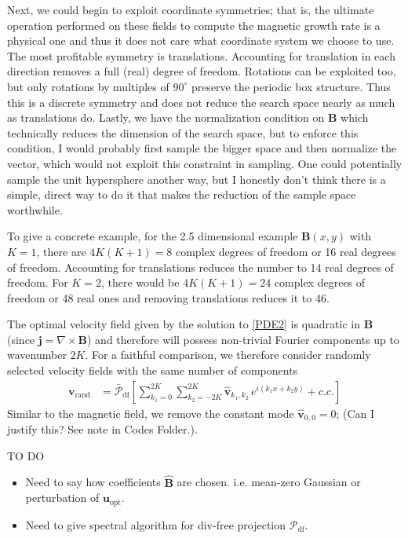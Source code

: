 \documentclass[onecolumn,showpacs,preprintnumbers,amsmath,amssymb]{revtex4-2}
\newcommand{\nick}[1]{{\color{orange}#1}}
\newcommand{\vsp}[1]{\vspace{#1 pc} \noindent}
\newcommand{\bvec}[1]{{\mathbf{#1}}}
\newcommand{\grad}{\nabla}
\newcommand{\uu}{\bvec{u}}
\newcommand{\uopt}{\uu_{\text{opt}}}
\newcommand{\vv}{\bvec{v}}
\newcommand{\Bvec}{\bvec{B}}
\newcommand{\jvec}{\bvec{j}}
\newcommand{\proj}{ \mathcal{P}_{\text{df}} }
\newcommand{\nproj}{ \bar{\mathcal{P}}_{\text{df}} }
\newcommand{\eikx}{e^{ i \left( k_1 x + k_2 y \right) }}
\newcommand{\vrand}{\vv_{\text{rand}}}
\begin{document}
Next, we could begin to exploit coordinate symmetries; that is, the ultimate operation performed on these fields to compute the magnetic growth rate is a physical one and thus it does not care what coordinate system we choose to use. The most profitable symmetry is translations. Accounting for translation in each direction removes a full (real) degree of freedom. Rotations can be exploited too, but only rotations by multiples of $90^\circ$ preserve the periodic box structure. Thus this is a discrete symmetry and does not reduce the search space nearly as much as translations do. Lastly, we have the normalization condition on $\Bvec$ which technically reduces the dimension of the search space, but to enforce this condition, I would probably first sample the bigger space and then normalize the vector, which would not exploit this constraint in sampling. One could potentially sample the unit hypersphere another way, but I honestly don't think there is a simple, direct way to do it that makes the reduction of the sample space worthwhile.

To give a concrete example, for the 2.5 dimensional example $\Bvec(x,y)$ with $K=1$, there are $4K(K+1) = 8$ complex degrees of freedom or 16 real degrees of freedom. Accounting for translations reduces the number to 14 real degrees of freedom. For $K=2$, there would be $4K(K+1)=24$ complex degrees of freedom or 48 real ones and removing translations reduces it to 46.
 
The optimal velocity field given by the solution to \cref{PDE2} is quadratic in $\Bvec$ (since $\jvec = \grad \times \Bvec$) and therefore will possess non-trivial Fourier components up to wavenumber $2K$. For a faithful comparison, we therefore consider randomly selected velocity fields with the same number of components
\begin{align}
\label{vrand}
\vrand &= \nproj \left[ 
\sum_{k_1=0}^{2K} \sum_{k_2=-2K}^{2K}
\hat{\vv}_{k_1, k_2} \, \eikx + c.c. \right]
\end{align}
Similar to the magnetic field, we remove the constant mode $\hat{\vv}_{0,0} = 0$; 
\nick{(Can I justify this? See note in Codes Folder.)}.

\vsp{5}
TO DO
\begin{itemize}
\item Need to say how coefficients $\hat{\Bvec}$ are chosen. i.e. mean-zero Gaussian or perturbation of $\uopt$.
\item Need to give spectral algorithm for div-free projection $\proj$.
\end{itemize}
\end{document}
